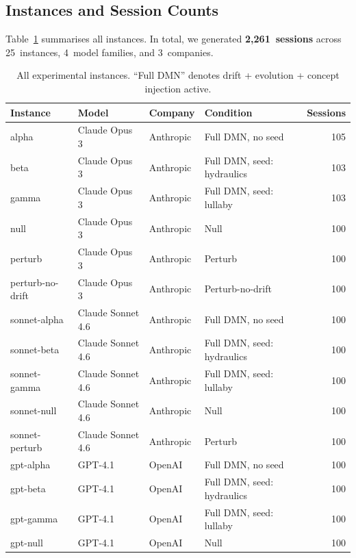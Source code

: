 \documentclass{article}
\begin{document}
\subsection{Instances and Session Counts}

Table~\ref{tab:instances} summarises all instances. In total, we generated
\textbf{2,261~sessions} across 25~instances, 4~model families, and
3~companies.

\begin{table}[h]
\centering
\caption{All experimental instances. ``Full DMN'' denotes drift + evolution + concept injection active.}
\label{tab:instances}
\begin{tabular}{llllr}
\toprule
\textbf{Instance} & \textbf{Model} & \textbf{Company} & \textbf{Condition} & \textbf{Sessions} \\
\midrule
alpha         & Claude Opus 3   & Anthropic & Full DMN, no seed          & 105 \\
beta          & Claude Opus 3   & Anthropic & Full DMN, seed: hydraulics & 103 \\
gamma         & Claude Opus 3   & Anthropic & Full DMN, seed: lullaby    & 103 \\
null          & Claude Opus 3   & Anthropic & Null                       & 100 \\
perturb       & Claude Opus 3   & Anthropic & Perturb                    & 100 \\
perturb-no-drift & Claude Opus 3 & Anthropic & Perturb-no-drift          & 100 \\
\midrule
sonnet-alpha  & Claude Sonnet 4.6 & Anthropic & Full DMN, no seed        & 100 \\
sonnet-beta   & Claude Sonnet 4.6 & Anthropic & Full DMN, seed: hydraulics & 100 \\
sonnet-gamma  & Claude Sonnet 4.6 & Anthropic & Full DMN, seed: lullaby  & 100 \\
sonnet-null   & Claude Sonnet 4.6 & Anthropic & Null                     & 100 \\
sonnet-perturb & Claude Sonnet 4.6 & Anthropic & Perturb                 & 100 \\
\midrule
gpt-alpha     & GPT-4.1         & OpenAI   & Full DMN, no seed          & 100 \\
gpt-beta      & GPT-4.1         & OpenAI   & Full DMN, seed: hydraulics & 100 \\
gpt-gamma     & GPT-4.1         & OpenAI   & Full DMN, seed: lullaby    & 100 \\
gpt-null      & GPT-4.1         & OpenAI   & Null                       & 100 \\

\end{tabular}
\end{table}
\end{document}
